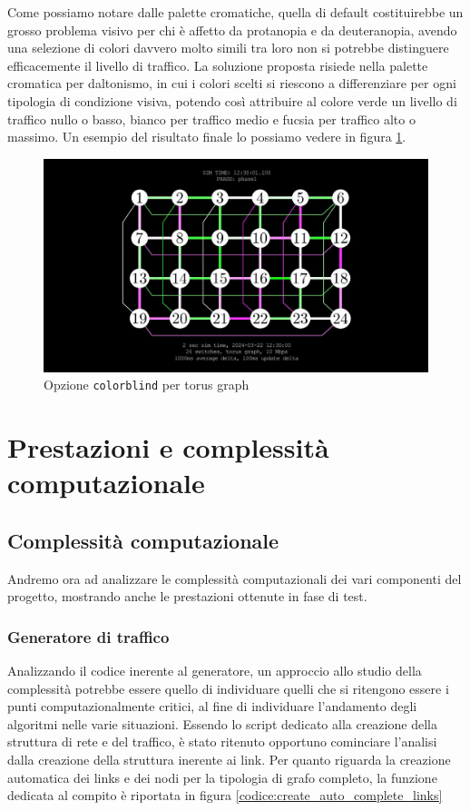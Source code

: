 \documentclass[binding=0.6cm]{sapthesis}
\begin{document}
Come possiamo notare dalle palette cromatiche, quella di default costituirebbe un grosso problema visivo per chi è affetto da protanopia e da deuteranopia, avendo
una selezione di colori davvero molto simili tra loro non si potrebbe distinguere efficacemente il livello di traffico. La soluzione proposta
risiede nella palette cromatica per daltonismo, in cui i colori scelti si riescono a differenziare per ogni tipologia di condizione visiva, potendo così
attribuire al colore verde un livello di traffico nullo o basso, bianco per traffico medio e fucsia per traffico alto o massimo. Un esempio
del risultato finale lo possiamo vedere in figura \ref{fig:colorblind_torus}.

\begin{figure}[h]
    \centering
    \includegraphics[width=1\textwidth]{immagini/colorblind_torus.JPG}
    \caption{Opzione \texttt{colorblind} per torus graph}
    \label{fig:colorblind_torus}
\end{figure}

\chapter{Prestazioni e complessità computazionale}

\section{Complessità computazionale}

Andremo ora ad analizzare le complessità computazionali dei vari componenti del progetto, mostrando anche le prestazioni ottenute in fase di test.

\subsection{Generatore di traffico}
\label{sec:generatore_di_traffico}
Analizzando il codice inerente al generatore, un approccio allo studio della complessità potrebbe essere quello di individuare quelli che si ritengono essere
i punti computazionalmente critici, al fine di individuare l'andamento degli algoritmi nelle varie situazioni. Essendo lo script dedicato alla creazione della struttura di rete e del traffico,
è stato ritenuto opportuno cominciare l'analisi dalla creazione della struttura inerente ai link.
Per quanto riguarda la creazione automatica dei links e dei nodi
per la tipologia di grafo completo, la funzione dedicata al compito è riportata in figura \ref{codice:create_auto_complete_links}
\end{document}
